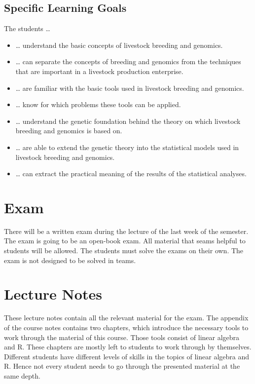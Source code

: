 \documentclass[
]{book}
\providecommand{\tightlist}{%
  \setlength{\itemsep}{0pt}\setlength{\parskip}{0pt}}
\begin{document}
\hypertarget{specific-learning-goals}{%
\subsection*{Specific Learning Goals}\label{specific-learning-goals}}

The students \ldots{}

\begin{itemize}
\tightlist
\item
  \ldots{} understand the basic concepts of livestock breeding and genomics.
\item
  \ldots{} can separate the concepts of breeding and genomics from the techniques that are important in a livestock production enterprise.
\item
  \ldots{} are familiar with the basic tools used in livestock breeding and genomics.
\item
  \ldots{} know for which problems these tools can be applied.
\item
  \ldots{} understand the genetic foundation behind the theory on which livestock breeding and genomics is based on.
\item
  \ldots{} are able to extend the genetic theory into the statistical models used in livestock breeding and genomics.
\item
  \ldots{} can extract the practical meaning of the results of the statistical analyses.
\end{itemize}

\hypertarget{exam}{%
\section*{Exam}\label{exam}}

There will be a written exam during the lecture of the last week of the semester. The exam is going to be an open-book exam. All material that seams helpful to students will be allowed. The students must solve the exams on their own. The exam is not designed to be solved in teams.

\hypertarget{lecture-notes}{%
\section*{Lecture Notes}\label{lecture-notes}}

These lecture notes contain all the relevant material for the exam. The appendix of the course notes contains two chapters, which introduce the necessary tools to work through the material of this course. Those tools consist of linear algebra and R. These chapters are mostly left to students to work through by themselves. Different students have different levels of skills in the topics of linear algebra and R. Hence not every student needs to go through the presented material at the same depth.
\end{document}

